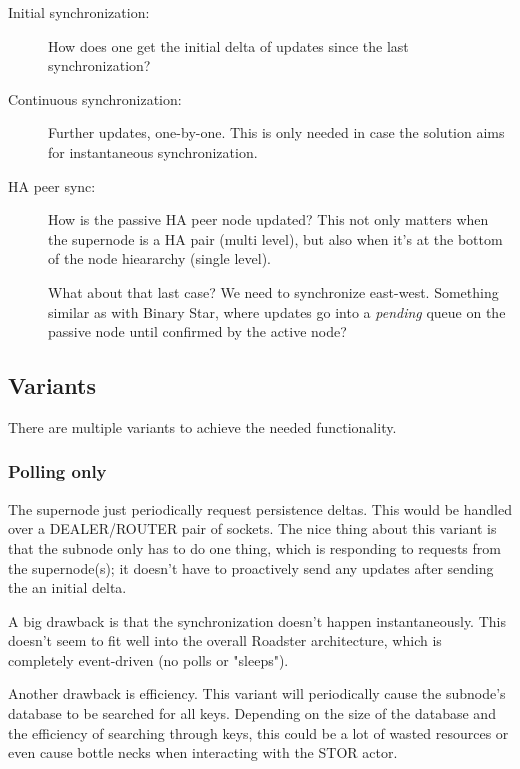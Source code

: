 \begin{description}
	\item [Initial synchronization:]
		How does one get the initial delta of updates since the last
		synchronization?

	\item [Continuous synchronization:]
		Further updates, one-by-one. This is only needed in
		case the solution aims for instantaneous synchronization.

	\item [HA peer sync:]
		How is the passive HA peer node updated?
		This not only matters when the supernode is a HA pair (multi
		level), but also when it's at the bottom of the node hieararchy
		(single level).

		\large\color{red} What about that last case? We need to synchronize
		east-west. Something similar as with Binary Star, where updates
		go into a \emph{pending} queue on the passive node until
		confirmed by the active node?
\end{description}

\subsection{Variants}
There are multiple variants to achieve the needed functionality.

\subsubsection{Polling only}
The supernode just periodically request persistence
deltas. This would be handled over a DEALER/ROUTER pair of sockets. The nice
thing about this variant is that the subnode only has to do one thing, which is
responding to requests from the supernode(s); it doesn't have to proactively
send any updates after sending the an initial delta.

A big drawback is that the synchronization doesn't happen instantaneously. This
doesn't seem to fit well into the overall Roadster architecture, which is
completely event-driven (no polls or "sleeps").

Another drawback is efficiency. This variant will periodically cause the
subnode's database to be searched for all keys. Depending on the size of the
database and the efficiency of searching through keys, this could be a lot of
wasted resources or even cause bottle necks when interacting with the STOR
actor.

